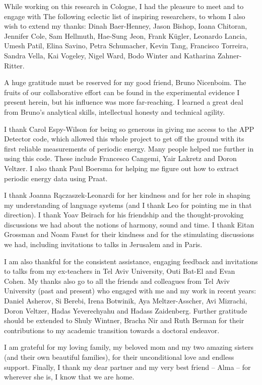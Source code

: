 While working on this research in Cologne, I had the pleasure to meet and to engage with The following eclectic list of inspiring researchers, to whom I also wish to extend my thanks: Dinah Baer-Henney, Jason Bishop, Ioana Chitoran, Jennifer Cole, Sam Hellmuth, Hae-Sung Jeon, Frank Kügler, Leonardo Lancia, Umesh Patil, Elina Savino, Petra Schumacher, Kevin Tang, Francisco Torreira, Sandra Vella, Kai Vogeley, Nigel Ward, Bodo Winter and Katharina Zahner-Ritter.

A huge gratitude must be reserved for my good friend, Bruno Nicenboim. The fruits of our collaborative effort can be found in the experimental evidence I present herein, but his influence was more far-reaching. I learned a great deal from Bruno's analytical skills, intellectual honesty and technical agility.

I thank Carol Espy-Wilson for being so generous in giving me access to the APP Detector code, which allowed this whole project to get off the ground with its first reliable measurements of periodic energy. Many people helped me further in using this code. These include Francesco Cangemi, Yair Lakretz and Doron Veltzer. I also thank Paul Boersma for helping me figure out how to extract periodic energy data using Praat.

I thank Joanna Rączaszek-Leonardi for her kindness and for her role in shaping my understanding of language systems (and I thank Leo for pointing me in that direction).
I thank Yoav Beirach for his friendship and the thought-provoking discussions we had about the notions of harmony, sound and time. I thank Eitan Grossman and Noam Faust for their kindness and for the stimulating discussions we had, including invitations to talks in Jerusalem and in Paris. 

I am also thankful for the consistent assistance, engaging feedback and invitations to talks from my ex-teachers in Tel Aviv University, Outi Bat-El and Evan Cohen. My thanks also go to all the friends and colleagues from Tel Aviv University (past and present) who engaged with me and my work in recent years: Daniel Asherov, Si Berebi, Irena Botwinik, Aya Meltzer-Asscher, Avi Mizrachi, Doron Veltzer, Hadas Yeverechyahu and Hadass Zaidenberg.
Further gratitude should be extended to Shuly Wintner, Bracha Nir and Ruth Berman for their contributions to my academic transition towards a doctoral endeavor.

I am grateful for my loving family, my beloved mom and my two amazing sisters (and their own beautiful families), for their unconditional love and endless support. Finally, I thank my dear partner and my very best friend -- Alma -- for wherever she is, I know that we are home.

